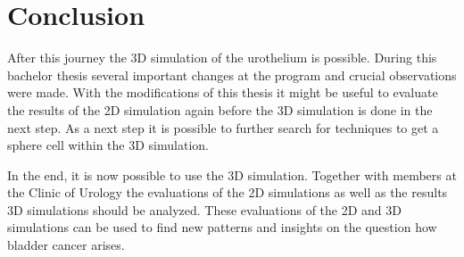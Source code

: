\chapter{Conclusion}
After this journey the 3D simulation of the urothelium is possible. During this bachelor thesis several important changes at the program and crucial observations were made. \newline
With the modifications of this thesis it might be useful to evaluate the results of the 2D simulation again before the 3D simulation is done in the next step. As a next step it is possible to further search for techniques to get a sphere cell within the 3D simulation.

In the end, it is now possible to use the 3D simulation. Together with members at the Clinic of Urology the evaluations of the 2D simulations as well as the results 3D simulations should be analyzed. These evaluations of the 2D and 3D simulations can be used to find new patterns and insights on the question how bladder cancer arises.